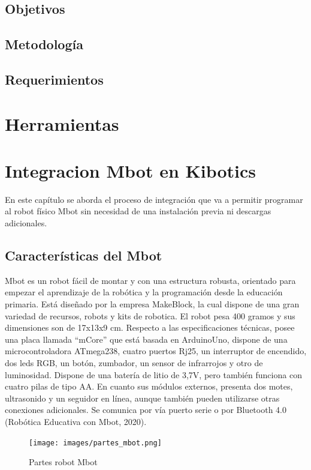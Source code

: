 \documentclass{report}
\begin{document}
\section{Objetivos}
\section{Metodología}
\section{Requerimientos}

\chapter{Herramientas}

\chapter{Integracion Mbot en Kibotics}
En este capítulo se aborda el proceso de integración que va a permitir programar al robot físico Mbot sin necesidad de una instalación previa ni descargas adicionales.

\section{Características del Mbot}

Mbot es un robot fácil de montar y con una estructura robusta, orientado para empezar el aprendizaje de la robótica y la programación desde la educación primaria. Está diseñado por la empresa MakeBlock, la cual dispone de una gran variedad de recursos, robots y kits de robotica.
El robot pesa 400 gramos y sus dimensiones son de 17x13x9 cm. Respecto a las especificaciones técnicas, posee una placa llamada “mCore” que está basada en ArduinoUno, dispone de una microcontroladora ATmega238, cuatro puertos Rj25, un interruptor de encendido, dos leds RGB, un botón, zumbador, un sensor de infrarrojos y otro de luminosidad. Dispone de una batería de litio de 3,7V, pero también funciona con cuatro pilas de tipo AA. En cuanto  sus módulos externos, presenta dos motes, ultrasonido y un seguidor en línea, aunque también pueden utilizarse otras conexiones adicionales. Se comunica por vía puerto serie o por Bluetooth 4.0 (Robótica Educativa con Mbot, 2020).
\\
\begin{figure}[h!]
  \centering
    \texttt{[image: images/partes\_mbot.png]}
  \caption{Partes robot Mbot}
  \label{Partes robot Mbot}
\end{figure}
\\
\end{document}
